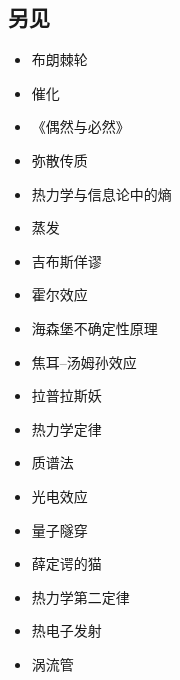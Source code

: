 \subsection{另见}
\begin{itemize}
\item 布朗棘轮
\item 催化
\item 《偶然与必然》
\item 弥散传质
\item 热力学与信息论中的熵
\item 蒸发
\item 吉布斯佯谬
\item 霍尔效应
\item 海森堡不确定性原理
\item 焦耳–汤姆孙效应
\item 拉普拉斯妖
\item 热力学定律
\item 质谱法
\item 光电效应
\item 量子隧穿
\item 薛定谔的猫
\item 热力学第二定律
\item 热电子发射
\item 涡流管
\end{itemize}

